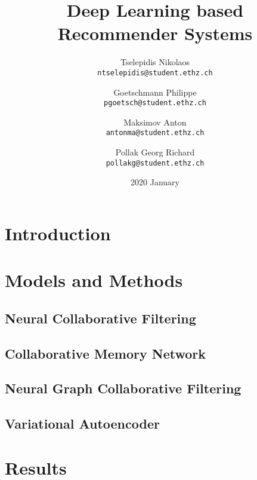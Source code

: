 \documentclass[
  twoColumns,
  fontsize=10pt,
  baseClass=extarticle
]{formularyETH/formularyETH}
\title{Deep Learning based Recommender Systems}
\author{
Tselepidis Nikolaos \\
\small{\texttt{ntselepidis@student.ethz.ch}}
    \and
Goetschmann Philippe \\
\small{\texttt{pgoetsch@student.ethz.ch}}
    \and
Maksimov Anton \\
\small{\texttt{antonma@student.ethz.ch}}
    \and
Pollak Georg Richard \\
\small{\texttt{pollakg@student.ethz.ch}}
}
\date{2020 January}
\begin{document}
\twocolumn[{%
  \begin{@twocolumnfalse} 
  \centering
  \maketitle
  \begin{abstract}
    
  \end{abstract}
  \end{@twocolumnfalse}
}]

\section{Introduction}\label{sec:introduction}


\section{Models and Methods}\label{sec:models_and_methods}
\subsection{Neural Collaborative Filtering}\label{subsec:neural_collaborative_filtering}

\subsection{Collaborative Memory Network}\label{subsec:collaborative_memory_network}

\subsection{Neural Graph Collaborative Filtering}\label{subsec:neural_graph_collaborative_filtering}

\subsection{Variational Autoencoder}\label{subsec:variational_autoencoder}


\section{Results}\label{sec:results}
\end{document}
